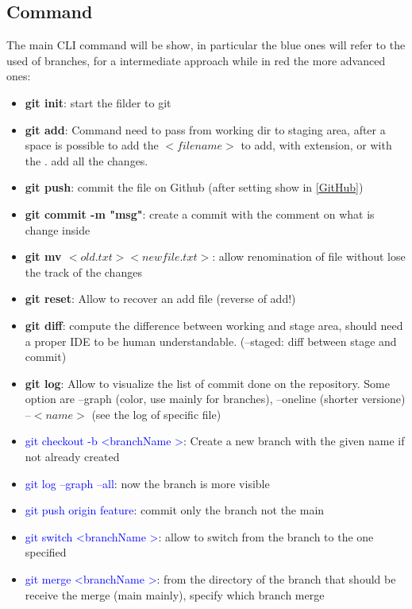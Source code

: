 \documentclass{report}
\begin{document}
\subsection{Command}
The main CLI command will be show, in particular the blue ones will refer to the used of branches, for a intermediate approach while in red the more advanced ones:
\begin{itemize}
    \item \textbf{git init}: start the filder to git 
    \item \textbf{git add}: Command need to pass from working dir to staging area, after a space is possible to add the $<filename>$ to add, with extension, or with the . add all the changes.
    \item \textbf{git push}: commit the file on Github (after setting show in \autoref{GitHub})
    \item \textbf{git commit -m "msg"}: create a commit with the comment on what is change inside
    \item  \textbf{git mv $<old.txt> <newfile.txt>$}: allow renomination of file without lose the track of the changes
    \item \textbf{git reset}: Allow to recover an add file (reverse of add!)
    \item  \textbf{git diff}: compute the difference between working and stage area, should need a proper IDE to be human understandable. (--staged: diff between stage and commit)
    \item \textbf{git log}: Allow to visualize the list of commit done on the repository. Some option are --graph (color, use mainly for branches), --oneline (shorter versione) --$<name>$ (see the log of specific file) 
    \item \textcolor{blue}{git checkout -b \textless branchName \textgreater}: Create a new branch with the given name if not already created
     \item \textcolor{blue}{git log --graph --all}: now the branch is more visible 
     \item \textcolor{blue}{git push origin feature}: commit only the branch not the main
     \item \textcolor{blue}{git switch \textless branchName \textgreater}: allow to switch from the branch to the one specified
     \item \textcolor{blue}{git merge \textless branchName \textgreater}: from the directory of the branch that should be receive the merge (main mainly), specify which branch merge \newline

\end{itemize}
\end{document}
